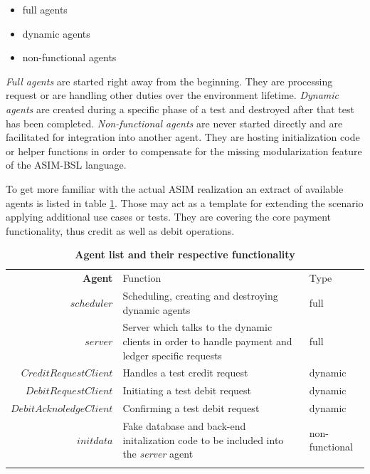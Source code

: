\begin{itemize}
	\item full agents
	\item dynamic agents
	\item non-functional agents
\end{itemize}

\textit{Full agents} are started right away from the beginning. They are processing request or are handling other duties over the environment lifetime. \textit{Dynamic agents} are created during a specific phase of a test and destroyed after that test has been completed. \textit{Non-functional agents} are never started directly and are facilitated for integration into another agent. They are hosting initialization code or helper functions in order to compensate for the missing modularization feature of the ASIM-BSL language.

To get more familiar with the actual ASIM realization an extract of available agents is listed in table \ref{tab:model-agents}. Those may act as a template for extending the scenario applying additional use cases or tests. They are covering the core payment functionality, thus credit as well as debit operations.

\begin{table}[H]
\begin{centering}
\small
{
\begin{tabular}{ r | p{9cm} | l }
\hline
\textbf{Agent}	& Function & Type \\
\Xhline{1.5pt}
$scheduler$				& Scheduling, creating and destroying dynamic agents & full\\[3pt]
\hline
$server$				& Server which talks to the dynamic clients in order to handle payment and ledger specific requests & full\\[3pt]
\hline
$CreditRequestClient$	& Handles a test credit request & dynamic\\[3pt]
\hline
$DebitRequestClient$	& Initiating a test debit request & dynamic\\[3pt]
\hline
$DebitAcknoledgeClient$	& Confirming a test debit request & dynamic\\[3pt]
\hline
$initdata$				& Fake database and back-end initalization code to be included into the \textit{server} agent & non-functional\\[3pt]
\Xhline{1.5pt}
\end{tabular}
}
\caption{\small\textbf{Agent list and their respective functionality}}
\label{tab:model-agents}
\end{centering}
\vspace{-0.5cm}
\end{table}

